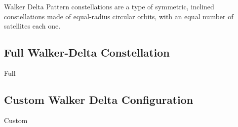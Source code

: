 
Walker Delta Pattern constellations are a type of symmetric, inclined constellations made of equal-radius circular orbits, with an equal number of satellites each one.

\subsection{Full Walker-Delta Constellation}
{Full}

\subsection{Custom Walker Delta Configuration}
{Custom}

